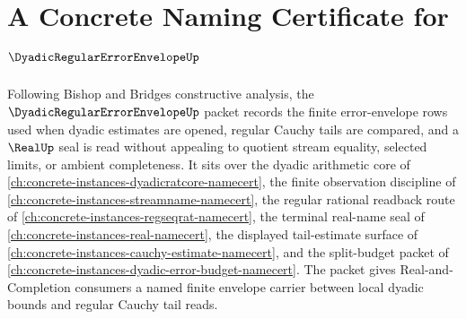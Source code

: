 \chapter{A Concrete Naming Certificate for $\DyadicRegularErrorEnvelopeUp$}
\label{ch:concrete-instances-dyadic-regular-error-envelope-namecert}

Following Bishop and Bridges constructive analysis, the $\DyadicRegularErrorEnvelopeUp$ packet records the finite error-envelope rows used when dyadic estimates are opened, regular Cauchy tails are compared, and a $\RealUp$ seal is read without appealing to quotient stream equality, selected limits, or ambient completeness. It sits over the dyadic arithmetic core of \autoref{ch:concrete-instances-dyadicratcore-namecert}, the finite observation discipline of \autoref{ch:concrete-instances-streamname-namecert}, the regular rational readback route of \autoref{ch:concrete-instances-regseqrat-namecert}, the terminal real-name seal of \autoref{ch:concrete-instances-real-namecert}, the displayed tail-estimate surface of \autoref{ch:concrete-instances-cauchy-estimate-namecert}, and the split-budget packet of \autoref{ch:concrete-instances-dyadic-error-budget-namecert}. The packet gives Real-and-Completion consumers a named finite envelope carrier between local dyadic bounds and regular Cauchy tail reads.

